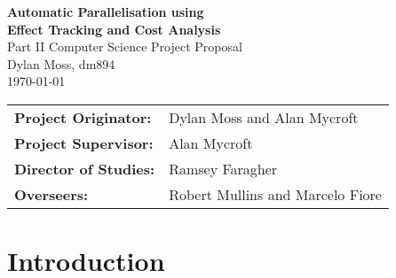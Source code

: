 \documentclass[12pt,a4paper,twoside]{article}
\begin{document}

\begin{titlepage} 

\vspace*{\fill}

\begin{center}
  \Huge
  \textbf{Automatic Parallelisation using \\ Effect Tracking and Cost Analysis} \\[6mm]
  \Large
  Part II Computer Science Project Proposal \\[2mm]
  Dylan Moss, dm894 \\[2mm]
  \today \\[8mm]
\end{center}

\vspace{150pt}

{\large
\begin{tabular}{ll}
  \bf Project Originator:  & Dylan Moss and Alan Mycroft          \\[4mm]
  \bf Project Supervisor:  & Alan Mycroft                \\[4mm]
  \bf Director of Studies: & Ramsey Faragher                   \\[4mm]
  \bf Overseers:           & Robert Mullins and Marcelo Fiore
\end{tabular}
}

\vspace{170pt}

\end{titlepage}

\section{Introduction}
\end{document}
